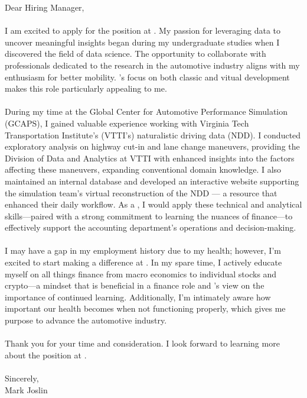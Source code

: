 \documentclass[10pt]{../cv} %
\begin{document}

\cvHeader{\name}{\designation}{\phone}{\location}{\email}{\github}{\linkedin}
\vspace{\baselineskip}


Dear Hiring Manager,
\\
\\
I am excited to apply for the \position{} position at \company{}. My passion for leveraging data to uncover meaningful insights began during my undergraduate studies when I discovered the field of data science. The opportunity to collaborate with professionals dedicated to the research in the automotive industry aligns with my enthusiasm for better mobility. \company{}’s focus on both classic and vitual development makes this role particularly appealing to me.
\\
\\
During my time at the Global Center for Automotive Performance Simulation (GCAPS), I gained valuable experience working with Virginia Tech Transportation Institute’s (VTTI’s) naturalistic driving data (NDD). I conducted exploratory analysis on highway cut-in and lane change maneuvers, providing the Division of Data and Analytics at VTTI with enhanced insights into the factors affecting these maneuvers, expanding conventional domain knowledge. I also maintained an internal database and developed an interactive website supporting the simulation team’s virtual reconstruction of the NDD — a resource that enhanced their daily workflow. As a \position{}, I would apply these technical and analytical skills—paired with a strong commitment to learning the nuances of finance—to effectively support the accounting department’s operations and decision-making.
\\
\\
I may have a gap in my employment history due to my health; however, I’m excited to start making a difference at \company{}. In my spare time, I actively educate myself on all things finance from macro economics to individual stocks and crypto—a mindset that is beneficial in a finance role and \company{}’s view on the importance of continued learning. Additionally, I'm intimately aware how important our health becomes when not functioning properly, which gives me purpose to advance the automotive industry.
\\
\\
Thank you for your time and consideration. I look forward to learning more about the \position{} position at \company{}.
\\
\\
Sincerely,
\\
Mark Joslin
\\
\\
\end{document}
